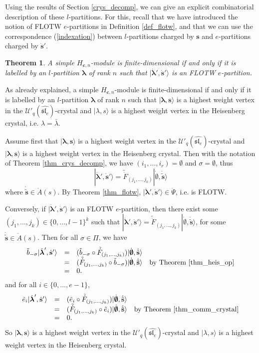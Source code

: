 \documentclass[twoside,12pt]{amsart}
\theoremstyle{plain}
\newcommand{\bc}{\mathbf{c}}
\newcommand{\bs}{\mathbf{s}}
\newcommand{\si}{\sigma}
\newcommand{\la}{\lambda}
\newcommand{\bla}{\boldsymbol{\la}}
\newcommand{\tb}{\tilde{b}}
\newcommand{\te}{\tilde{e}}
\newcommand{\dA}{\dot{A}}
\newcommand{\dPsi}{\dot{\Psi}}
\newcommand{\dbs}{\dot{\bs}}
\newcommand{\dbla}{\dot{\bla}}
\newcommand{\tdF}{\tilde{\dot{F}}}
\newcommand{\tbs}{\tilde{\bs}}
\newcommand{\dtbs}{\dot{\tbs}}
\newcommand{\Ue}{\mathcal{U}'_q (\widehat{\mathfrak{sl}_e})}
\newcommand{\bemp}{\boldsymbol{\emptyset}}
\newcommand{\dbemp}{\dot{\bemp}}
\newtheorem{thm}[num]{Theorem}
\theoremstyle{remark}
\begin{document}
Using the results of Section \ref{crys_decomp},
we can give an explicit combinatorial description of these $l$-partitions.
For this, recall that we have introduced the notion of FLOTW $e$-partitions in Definition \ref{def_flotw},
and that we can use the correspondence (\ref{indexation}) between $l$-partitions charged by $\bs$ and
$e$-partitions charged by $\dbs'$.

\begin{thm}\label{thm_cher}
A simple $H_{\bc,n}$-module is finite-dimensional 
if and only if it is labelled by an $l$-partition $\bla$ of rank $n$ such that
$|\dbla',\dbs'\rangle$ is an FLOTW $e$-partition.
\end{thm}


\proof
As already explained, a simple $H_{\bc,n}$-module is finite-dimensional 
if and only if it is labelled by an $l$-partition $\bla$ of rank $n$ such that
$|\bla,\bs\rangle$ is a highest weight vertex in the $\Ue$-crystal and
$|\la,s\rangle$ is a highest weight vertex in the Heisenberg crystal, 
i.e. $\la=\bar{\la}$.

Assume first that 
$|\bla,\bs\rangle$ is a highest weight vertex in the $\Ue$-crystal and
$|\bla,\bs\rangle$ is a highest weight vertex in the Heisenberg crystal.
Then with the notation of Theorem \ref{thm_crys_decomp}, we have 
$(i_1,\dots,i_r)=\emptyset$ and $\si=\emptyset$, thus
$$|\dbla',\dbs'\rangle = \tdF_{(j_1,\dots,j_k)}|\dbemp,\dtbs\rangle$$
where $\dtbs\in \dA(s)$.
By Theorem \ref{thm_flotw}, $|\dbla',\dbs'\rangle \in\dPsi$, i.e. is FLOTW.

Conversely, if $|\dbla',\dbs'\rangle$ is an FLOTW $e$-partition, then there exist some
$(j_1,\dots,j_k) \in \{0,\dots,l-1\}^k$ such that 
$|\dbla',\dbs'\rangle = \tdF_{(j_1,\dots,j_k)}|\dbemp,\dtbs\rangle$,
for some $\dtbs\in \dA(s)$.
Then for all $\si\in\Pi$, we have
$$
\begin{array}{ccll}
\tb_{-\si} |\dbla',\dbs'\rangle &  = & (\tb_{-\si} \circ \tdF_{(j_1,\dots,j_k)}) |\dbemp,\dtbs\rangle & \\
& = & (\tdF_{(j_1,\dots,j_k)} \circ\tb_{-\si})|\dbemp,\dtbs\rangle & \text{by Theorem \ref{thm_heis_op}} \\
& = & 0. & \end{array}
$$
and for all $i\in\{0,\dots,e-1\}$,
$$
\begin{array}{ccll}
\te_i |\dbla',\dbs'\rangle &  = & (\te_i \circ \tdF_{(j_1,\dots,j_k)}) |\dbemp,\dtbs\rangle & \\
& = & (\tdF_{(j_1,\dots,j_k)} \circ\te_i)|\dbemp,\dtbs\rangle & \text{by Theorem \ref{thm_comm_crystal}} \\
& = & 0. & \end{array}
$$
So $|\bla,\bs\rangle$ is a highest weight vertex in the $\Ue$-crystal and
$|\la,s\rangle$ is a highest weight vertex in the Heisenberg crystal.
\endproof
\end{document}

